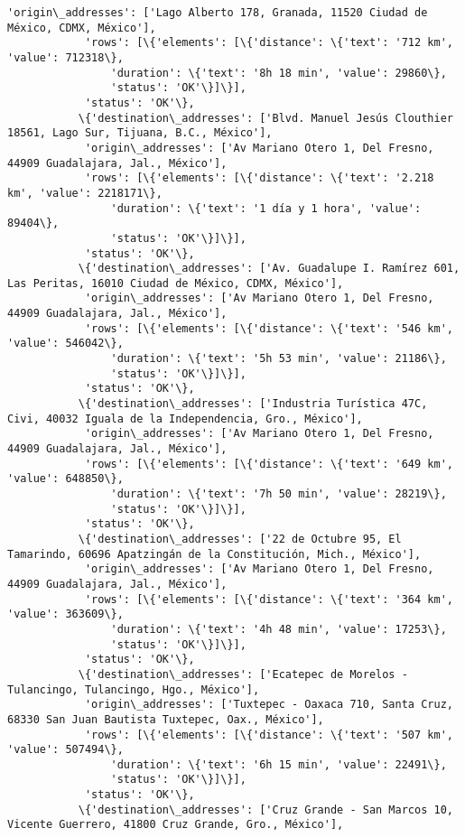 \documentclass[11pt]{article}
\begin{document}
\begin{Verbatim}[commandchars=\\\{\}]
            'origin\_addresses': ['Lago Alberto 178, Granada, 11520 Ciudad de México, CDMX, México'],
            'rows': [\{'elements': [\{'distance': \{'text': '712 km', 'value': 712318\},
                'duration': \{'text': '8h 18 min', 'value': 29860\},
                'status': 'OK'\}]\}],
            'status': 'OK'\},
           \{'destination\_addresses': ['Blvd. Manuel Jesús Clouthier 18561, Lago Sur, Tijuana, B.C., México'],
            'origin\_addresses': ['Av Mariano Otero 1, Del Fresno, 44909 Guadalajara, Jal., México'],
            'rows': [\{'elements': [\{'distance': \{'text': '2.218 km', 'value': 2218171\},
                'duration': \{'text': '1 día y 1 hora', 'value': 89404\},
                'status': 'OK'\}]\}],
            'status': 'OK'\},
           \{'destination\_addresses': ['Av. Guadalupe I. Ramírez 601, Las Peritas, 16010 Ciudad de México, CDMX, México'],
            'origin\_addresses': ['Av Mariano Otero 1, Del Fresno, 44909 Guadalajara, Jal., México'],
            'rows': [\{'elements': [\{'distance': \{'text': '546 km', 'value': 546042\},
                'duration': \{'text': '5h 53 min', 'value': 21186\},
                'status': 'OK'\}]\}],
            'status': 'OK'\},
           \{'destination\_addresses': ['Industria Turística 47C, Civi, 40032 Iguala de la Independencia, Gro., México'],
            'origin\_addresses': ['Av Mariano Otero 1, Del Fresno, 44909 Guadalajara, Jal., México'],
            'rows': [\{'elements': [\{'distance': \{'text': '649 km', 'value': 648850\},
                'duration': \{'text': '7h 50 min', 'value': 28219\},
                'status': 'OK'\}]\}],
            'status': 'OK'\},
           \{'destination\_addresses': ['22 de Octubre 95, El Tamarindo, 60696 Apatzingán de la Constitución, Mich., México'],
            'origin\_addresses': ['Av Mariano Otero 1, Del Fresno, 44909 Guadalajara, Jal., México'],
            'rows': [\{'elements': [\{'distance': \{'text': '364 km', 'value': 363609\},
                'duration': \{'text': '4h 48 min', 'value': 17253\},
                'status': 'OK'\}]\}],
            'status': 'OK'\},
           \{'destination\_addresses': ['Ecatepec de Morelos - Tulancingo, Tulancingo, Hgo., México'],
            'origin\_addresses': ['Tuxtepec - Oaxaca 710, Santa Cruz, 68330 San Juan Bautista Tuxtepec, Oax., México'],
            'rows': [\{'elements': [\{'distance': \{'text': '507 km', 'value': 507494\},
                'duration': \{'text': '6h 15 min', 'value': 22491\},
                'status': 'OK'\}]\}],
            'status': 'OK'\},
           \{'destination\_addresses': ['Cruz Grande - San Marcos 10, Vicente Guerrero, 41800 Cruz Grande, Gro., México'],

\end{Verbatim}
\end{document}
